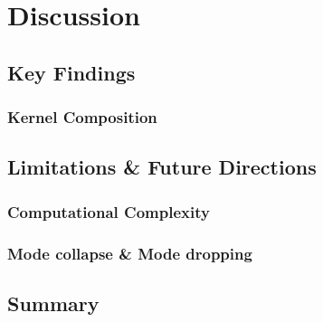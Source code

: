 \chapter{Discussion}

\section{Key Findings}

\subsection{Kernel Composition}

\section{Limitations \& Future Directions}

\subsection{Computational Complexity}

\subsection{Mode collapse \& Mode dropping}

\section{Summary}
